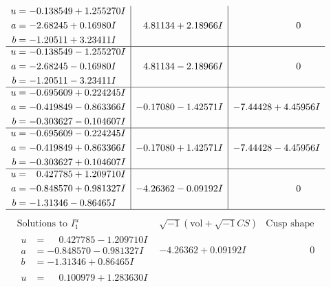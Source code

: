 \documentclass[1p]{elsarticle_modified}
\theoremstyle{definition}
\newcommand{\I}{\sqrt{-1}}
\begin{document}
$$\begin{array}{c|c|c}
\begin{aligned}
u &= -0.138549 + 1.255270 I \\
a &= -2.68245 + 0.16980 I \\
b &= -1.20511 + 3.23411 I\end{aligned}
 & \phantom{-}4.81134 + 2.18966 I & \phantom{-0.000000 } 0 \\ \hline\begin{aligned}
u &= -0.138549 - 1.255270 I \\
a &= -2.68245 - 0.16980 I \\
b &= -1.20511 - 3.23411 I\end{aligned}
 & \phantom{-}4.81134 - 2.18966 I & \phantom{-0.000000 } 0 \\ \hline\begin{aligned}
u &= -0.695609 + 0.224245 I \\
a &= -0.419849 - 0.863366 I \\
b &= -0.303627 - 0.104607 I\end{aligned}
 & -0.17080 - 1.42571 I & -7.44428 + 4.45956 I \\ \hline\begin{aligned}
u &= -0.695609 - 0.224245 I \\
a &= -0.419849 + 0.863366 I \\
b &= -0.303627 + 0.104607 I\end{aligned}
 & -0.17080 + 1.42571 I & -7.44428 - 4.45956 I \\ \hline\begin{aligned}
u &= \phantom{-}0.427785 + 1.209710 I \\
a &= -0.848570 + 0.981327 I \\
b &= -1.31346 - 0.86465 I\end{aligned}
 & -4.26362 - 0.09192 I & \phantom{-0.000000 } 0\\
 \hline 
 \end{array}$$\newpage$$\begin{array}{c|c|c}  
\text{Solutions to }I^u_{1}& \I (\text{vol} + \sqrt{-1}CS) & \text{Cusp shape}\\
 \hline 
\begin{aligned}
u &= \phantom{-}0.427785 - 1.209710 I \\
a &= -0.848570 - 0.981327 I \\
b &= -1.31346 + 0.86465 I\end{aligned}
 & -4.26362 + 0.09192 I & \phantom{-0.000000 } 0 \\ \hline\begin{aligned}
u &= \phantom{-}0.100979 + 1.283630 I \\

\end{aligned}
\end{array}$$
\end{document}
